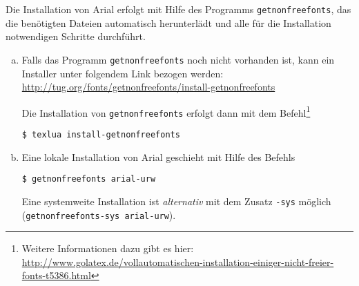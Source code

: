 \begin{description}
    Die Installation von Arial erfolgt mit Hilfe des Programms
    \lstinline{getnonfreefonts}, das die benötigten Dateien automatisch
    herunterlädt und alle für die Installation notwendigen Schritte durchführt.
    \begin{enumerate}[a)]
      \item Falls das Programm \lstinline{getnonfreefonts} noch nicht vorhanden
        ist, kann ein Installer unter folgendem Link bezogen werden:\\
        \url{http://tug.org/fonts/getnonfreefonts/install-getnonfreefonts}
    
        Die Installation von \lstinline{getnonfreefonts} erfolgt dann mit dem
        Befehl\footnote{Weitere Informationen dazu gibt es hier:\\
          \url{http://www.golatex.de/vollautomatischen-installation-einiger-nicht-freier-fonts-t5386.html}}
        \begin{lstlisting}[style=cmd]
$ texlua install-getnonfreefonts
        \end{lstlisting}
        
      \item Eine lokale Installation von Arial geschieht mit Hilfe des Befehls
    \begin{lstlisting}[style=cmd]
$ getnonfreefonts arial-urw
    \end{lstlisting}
    
    Eine systemweite Installation ist \emph{alternativ} mit dem Zusatz \lstinline{-sys}
    möglich\\ (\lstinline{getnonfreefonts-sys arial-urw}).
    \end{enumerate}

\end{description}




\def\foonote{%
kpathsea: Running mktexpk --mfmode / --bdpi 600 --mag 1+240/600 --dpi 840 NexusProSans-Bold-Regular--base
mktexpk: don't know how to create bitmap font for NexusProSans-Bold-Regular--base.

Reproduce:
  - sudo updmap
  - sudo aptitude install texlive-tubs
Test:
  - wenn 'kpsewhich pdftex.map' nicht /var/lib/.. ausgibt, liegt der Fehler vor
Beschreibung:
  - Dieses Problem kann unter anderem auftreten, wenn vor der Installation
    irgendwann einmal 'updmap' aufgerufen wurde.
Begründung:
  - Installation greift auf updmap-sys zurück, die Damit generierte Datei
    wird aber nicht mehr verwendet.
Lösung 1:
  - updmap manuell aufrufen.
Lösung 2:
  - Datei, die bei 'kpsewhich pdftex.map' angezeigt wird, löschen
    (z.B. /root/.texmf-var/fonts/map/pdftex/updmap/pdftex.map)
  - 'sudo updmap-sys' aufrufen
}
